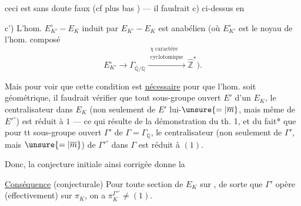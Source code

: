 ceci est sans doute faux (cf plus bas ) --- il faudrait    c) ci-dessus en

c') L'hom. $E_{K'}^\circ-E_K$ induit par $E_{K'}-E_K$ est anabélien (où $E_{K'}^\circ$ est le noyau de l'hom. composé
\[
E_{K'}^\circ\longrightarrow\Gamma_{\overline{\mathbb Q}/\mathbb Q}\xrightarrow{\substack{\chi\ \text{caractère}\\\text{cyclotomique}}}\widehat{\mathbb Z}^{*}).
\]

Mais pour voir que cette condition est \uline{nécessaire} pour que l'hom. soit géométrique, il faudrait  vérifier que  tout sous-groupe ouvert $E'$ d'un $E_K$, le centralisateur dans $E_K$ (non seulement de $E'$ lui-$\unsure{=|\overline m}$, mais même de $E'^\circ$) est réduit à $1$ --- ce qui résulte de la démonstration du th. 1, et du fait* que pour tt sous-groupe ouvert $\Gamma'$ de $\Gamma=\Gamma_{\mathbb Q}$, le centralisateur (non seulement de $\Gamma'$, mais $\unsure{=|\overline m}$) de $\Gamma'^\circ$ dans $\Gamma$ est réduit à $(1)$.

Donc, la conjecture initiale ainsi corrigée donne la

\uline{Conséquence} (conjecturale) Pour toute  section de $E_K$ sur  , de sorte que $\Gamma'$ opère (effectivement) sur $\pi_K$, on a  $\pi_K^{\Gamma'^\circ}\ne(1)$.

